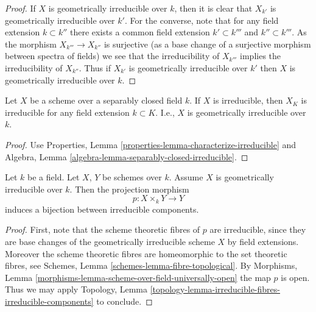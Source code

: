 \begin{proof}
If $X$ is geometrically irreducible over $k$, then it is clear that
$X_{k'}$ is geometrically irreducible over $k'$. For the converse, note
that for any field extension $k \subset k''$ there exists a common
field extension $k' \subset k'''$ and $k'' \subset k'''$. As the
morphism $X_{k'''} \to X_{k''}$ is surjective (as a base change of
a surjective morphism between spectra of fields) we see that the
irreducibility of $X_{k'''}$ implies the irreducibility of $X_{k''}$.
Thus if $X_{k'}$ is geometrically irreducible over $k'$ then
$X$ is geometrically irreducible over $k$.
\end{proof}

\begin{lemma}
\label{lemma-separably-closed-irreducible}
Let $X$ be a scheme over a separably closed field $k$.
If $X$ is irreducible, then $X_K$ is irreducible for any
field extension $k \subset K$. I.e., $X$ is geometrically
irreducible over $k$.
\end{lemma}

\begin{proof}
Use Properties, Lemma \ref{properties-lemma-characterize-irreducible}
and Algebra, Lemma \ref{algebra-lemma-separably-closed-irreducible}.
\end{proof}

\begin{lemma}
\label{lemma-bijection-irreducible-components}
Let $k$ be a field.
Let $X$, $Y$ be schemes over $k$.
Assume $X$ is geometrically irreducible over $k$.
Then the projection morphism
$$
p : X \times_k Y \longrightarrow Y
$$
induces a bijection between irreducible components.
\end{lemma}

\begin{proof}
First, note that the scheme theoretic fibres of $p$ are irreducible,
since they are base changes of the geometrically irreducible scheme $X$
by field extensions. Moreover the scheme theoretic fibres are
homeomorphic to the set theoretic fibres, see
Schemes, Lemma \ref{schemes-lemma-fibre-topological}.
By Morphisms, Lemma \ref{morphisms-lemma-scheme-over-field-universally-open}
the map $p$ is open.
Thus we may apply Topology,
Lemma \ref{topology-lemma-irreducible-fibres-irreducible-components}
to conclude.
\end{proof}

